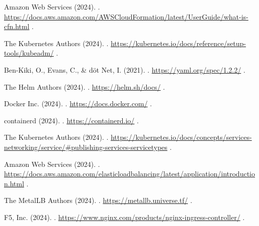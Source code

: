 \begin{thebibliography}{99}
    Amazon Web Services (2024).
    .
    \newblock \url{https://docs.aws.amazon.com/AWSCloudFormation/latest/UserGuide/what-is-cfn.html}
    \newblock [Accessed: 18/06/2024].

    The Kubernetes Authors (2024).
    .
    \newblock \url{https://kubernetes.io/docs/reference/setup-tools/kubeadm/}
    \newblock [Accessed: 18/06/2024].

    Ben-Kiki, O., Evans, C., \& döt Net, I. (2021).
    .
    \newblock \url{https://yaml.org/spec/1.2.2/}
    \newblock [Accessed: 18/06/2024].
    
    The Helm Authors (2024).
    .
    \newblock \url{https://helm.sh/docs/}
    \newblock [Accessed: 18/06/2024].

    Docker Inc. (2024).
    .
    \newblock \url{https://docs.docker.com/}
    \newblock [Accessed: 18/06/2024].

    containerd (2024).
    .
    \newblock \url{https://containerd.io/}
    \newblock [Accessed: 18/06/2024].

    The Kubernetes Authors (2024).
    .
    \newblock \url{https://kubernetes.io/docs/concepts/services-networking/service/#publishing-services-servicetypes}
    \newblock [Accessed: 18/06/2024].

    Amazon Web Services (2024).
    .
    \newblock \url{https://docs.aws.amazon.com/elasticloadbalancing/latest/application/introduction.html}
    \newblock [Accessed: 18/06/2024].

    The MetalLB Authors (2024).
    .
    \newblock \url{https://metallb.universe.tf/}
    \newblock [Accessed: 18/06/2024].

    F5, Inc. (2024).
    .
    \newblock \url{https://www.nginx.com/products/nginx-ingress-controller/}
    \newblock [Accessed: 18/06/2024].


\end{thebibliography}
